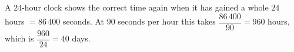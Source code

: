 A $24$-hour clock shows the correct time again when it has gained a whole $24$ hours $=86\,400$ seconds. At $90$ seconds per hour this takes $\dfrac{86\,400}{90}=960$ hours, which is $\dfrac{960}{24}=\boxed{40}$ days.
